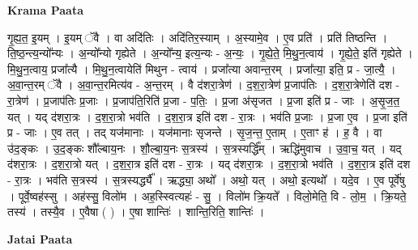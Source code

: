 \documentclass[17pt]{extarticle}
\begin{document}
\textbf{Krama Paata} \newline

गृ॒ह्य॒त॒ इ॒यम् । इ॒यम् ॅवै । वा अदि॑तिः । अदि॑तिर॒स्याम् । अ॒स्यामे॒व । ए॒व प्रति॑ । प्रति॑ तिष्ठन्ति । ति॒ष्ठ॒न्त्य॒न्यो᳚न्यः । अ॒न्यो᳚न्यो गृह्येते । अ॒न्यो᳚न्य॒ इत्य॒न्यः - अ॒न्यः॒ । गृ॒ह्ये॒ते॒ मि॒थु॒न॒त्वाय॑ । गृ॒ह्ये॒ते॒ इति॑ गृह्येते । मि॒थु॒न॒त्वाय॒ प्रजा᳚त्यै । मि॒थु॒न॒त्वायेति॑ मिथुन - त्वाय॑ । प्रजा᳚त्या अवान्त॒रम् । प्रजा᳚त्या॒ इति॒ प्र - जा॒त्यै॒ । अ॒वा॒न्त॒रम् ॅवै । अ॒वा॒न्त॒रमित्य॑व - अ॒न्त॒रम् । वै द॑शरा॒त्रेण॑ । द॒श॒रा॒त्रेण॑ प्र॒जाप॑तिः । द॒श॒रा॒त्रेणेति॑ दश - रा॒त्रेण॑ । प्र॒जाप॑तिः प्र॒जाः । प्र॒जाप॑ति॒रिति॑ प्र॒जा - प॒तिः॒ । प्र॒जा अ॑सृजत । प्र॒जा इति॑ प्र - जाः । अ॒सृ॒ज॒त॒ यत् । यद् द॑शरा॒त्रः । द॒श॒रा॒त्रो भव॑ति । द॒श॒रा॒त्र इति॑ दश - रा॒त्रः । भव॑ति प्र॒जाः । प्र॒जा ए॒व । प्र॒जा इति॑ प्र - जाः । ए॒व तत् । तद् यज॑मानाः । यज॑मानाः सृजन्ते । सृ॒ज॒न्त॒ ए॒ताम् । ए॒ताꣳ ह॑ । ह॒ वै । वा उ॑द॒ङ्‍कः । उ॒द॒ङ्‍कः शौ᳚ल्बाय॒नः । शौ॒ल्बा॒य॒नः स॒त्रस्य॑ । स॒त्रस्यर्द्धि᳚म् । ऋद्धि॑मुवाच । उ॒वा॒च॒ यत् । यद् द॑शरा॒त्रः । द॒श॒रा॒त्रो यत् । द॒श॒रा॒त्र इति॑ दश - रा॒त्रः । यद् द॑शरा॒त्रः । द॒श॒रा॒त्रो भव॑ति । द॒श॒रा॒त्र इति॑ दश - रा॒त्रः । भव॑ति स॒त्रस्य॑ । स॒त्रस्यर्द्ध्यै᳚ । ऋद्ध्या॒ अथो᳚ । अथो॒ यत् । अथो॒ इत्यथो᳚ । यदे॒व । ए॒व पूर्वे॑षु । पूर्वे॒ष्वह॑स्सु । अह॑स्सु॒ विलो॑म । अह॒स्स्वित्यहः॑ - सु॒ । विलो॑म क्रि॒यते᳚ । विलो॒मेति॒ वि - लो॒म॒ । क्रि॒यते॒ तस्य॑ । तस्यै॒व । ए॒वैषा ( ) । ए॒षा शान्तिः॑ । शान्ति॒रिति॒ शान्तिः॑ । \newline

\textbf{Jatai Paata} \newline
\end{document}
